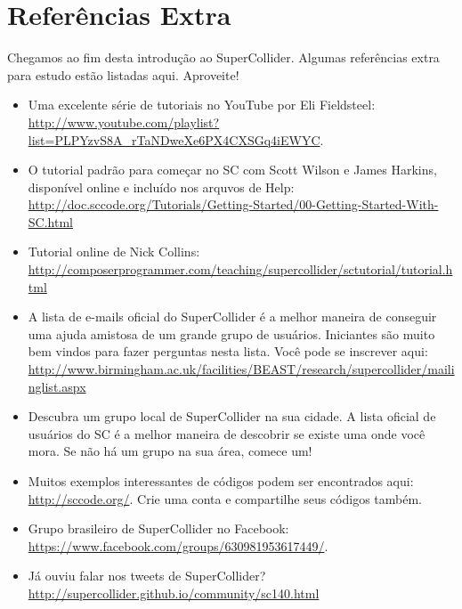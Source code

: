 \section{Referências Extra}

Chegamos ao fim desta introdução ao SuperCollider. Algumas referências extra para estudo estão listadas aqui. Aproveite!

\begin{itemize}
\item Uma excelente série de tutoriais no YouTube por Eli Fieldsteel: \url{http://www.youtube.com/playlist?list=PLPYzvS8A_rTaNDweXe6PX4CXSGq4iEWYC}. 

\item O tutorial padrão para começar no SC com Scott Wilson e James Harkins, disponível online e incluído nos arquvos de Help:  
\url{http://doc.sccode.org/Tutorials/Getting-Started/00-Getting-Started-With-SC.html}

\item Tutorial online de Nick Collins: \url{http://composerprogrammer.com/teaching/supercollider/sctutorial/tutorial.html}
 
\item A lista de e-mails oficial do SuperCollider é a melhor maneira de conseguir uma ajuda amistosa de um grande grupo de usuários. Iniciantes são muito bem vindos para fazer perguntas nesta lista. Você pode se inscrever aqui: \url{http://www.birmingham.ac.uk/facilities/BEAST/research/supercollider/mailinglist.aspx}

\item Descubra um grupo local de SuperCollider na sua cidade. A lista oficial de usuários do SC é a melhor maneira de descobrir se existe uma onde você mora. Se não há um grupo na sua área, comece um!

\item Muitos exemplos interessantes de códigos podem ser encontrados aqui: \url{http://sccode.org/}. Crie uma conta e compartilhe seus códigos também.

\item Grupo brasileiro de SuperCollider no Facebook: \url{https://www.facebook.com/groups/630981953617449/}.

\item Já ouviu falar nos tweets de SuperCollider? \url{http://supercollider.github.io/community/sc140.html}

\end{itemize}
